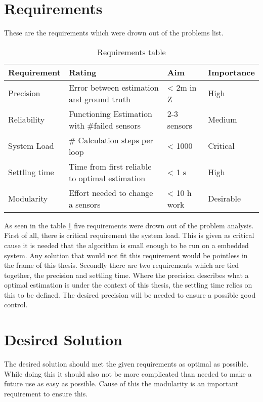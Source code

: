  \section{Requirements}
 These are the requirements which were drown out of the problems list.
 
 \begin{table}[h]
 \centering
 \begin{tabular}{|l|l|l|l|}	
 \hline	
 \bf{Requirement}   & \bf{Rating} & \bf{Aim} & \bf{Importance} \\ \hline
 Precision     & Error between estimation and ground truth  & < 2m in Z & High  \\ \hline
 Reliability   & Functioning Estimation with \#failed sensors & 2-3 sensors & Medium \\ \hline	
 System Load   & \# Calculation steps per loop & < 1000 & Critical \\ \hline
 Settling time & Time from first reliable to optimal estimation  & < 1 s &  High \\ \hline
 Modularity    & Effort needed to change a sensors & < 10 h work &  Desirable \\ \hline
 \end{tabular}	
 \caption{Requirements table}
 \label{tab:Requirements}
 \end{table}
 
 As seen in the table \ref{tab:Requirements} five requirements were drown out of the problem analysis. 
 First of all, there is critical requirement the system load. This is given as critical cause it is needed that the algorithm is small enough to be run on a embedded system.
 Any solution that would not fit this requirement would be pointless in the frame of this thesis.
 Secondly there are two requirements which are tied together, the precision and settling time.
 Where the precision describes what a optimal estimation is under the context of this thesis, the settling time relies on this to be defined.
 The desired precision will be needed to ensure a possible good control.
 \section{Desired Solution}
 The desired solution should met the given requirements as optimal as possible. While doing this it should also not be more complicated than needed
 to make a future use as easy as possible. Cause of this the modularity is an important requirement to ensure this.
